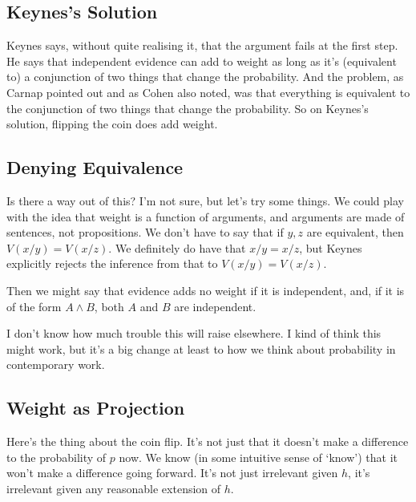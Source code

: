 \documentclass[
  11pt,
  letterpaper,
  DIV=11,
  numbers=noendperiod,
  oneside]{scrartcl}
\begin{document}
\subsection{Keynes's Solution}\label{keyness-solution}

Keynes says, without quite realising it, that the argument fails at the
first step. He says that independent evidence can add to weight as long
as it's (equivalent to) a conjunction of two things that change the
probability. And the problem, as Carnap pointed out and as Cohen also
noted, was that everything is equivalent to the conjunction of two
things that change the probability. So on Keynes's solution, flipping
the coin does add weight.

\subsection{Denying Equivalence}\label{denying-equivalence}

Is there a way out of this? I'm not sure, but let's try some things. We
could play with the idea that weight is a function of arguments, and
arguments are made of sentences, not propositions.
We don't have to say that if \(y, z\) are equivalent, then
\(V(x/y) = V(x/z)\). We definitely do have that \(x/y = x/z\), but
Keynes explicitly rejects the inference from that to
\(V(x/y) = V(x/z)\).

Then we might say that evidence adds no weight if it is independent,
and, if it is of the form \(A \wedge B\), both \(A\) and \(B\) are
independent.

I don't know how much trouble this will raise elsewhere. I kind of think
this might work, but it's a big change at least to how we think about
probability in contemporary work.

\subsection{Weight as Projection}\label{weight-as-projection}

Here's the thing about the coin flip. It's not just that it doesn't make
a difference to the probability of \(p\) now. We know (in some intuitive
sense of `know') that it won't make a difference going forward. It's not
just irrelevant given \(h\), it's irrelevant given any reasonable
extension of \(h\).
\end{document}
